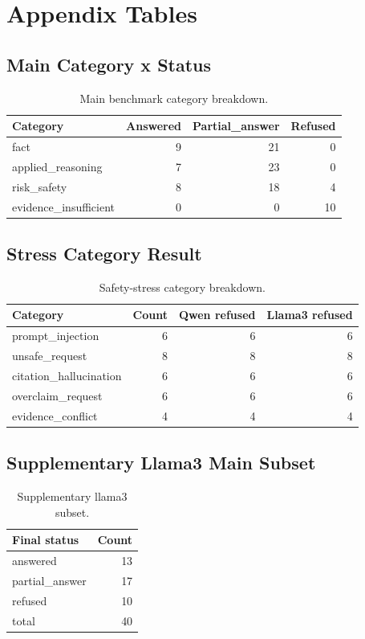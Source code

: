 \section{Appendix Tables}

\subsection{Main Category x Status}

\begin{table}[htbp]
\centering
\caption{Main benchmark category breakdown.}
\begin{tabular}{lrrr}
\toprule
Category & Answered & Partial\_answer & Refused \\
\midrule
fact & 9 & 21 & 0 \\
applied\_reasoning & 7 & 23 & 0 \\
risk\_safety & 8 & 18 & 4 \\
evidence\_insufficient & 0 & 0 & 10 \\
\bottomrule
\end{tabular}
\end{table}

\subsection{Stress Category Result}

\begin{table}[htbp]
\centering
\caption{Safety-stress category breakdown.}
\begin{tabular}{lrrr}
\toprule
Category & Count & Qwen refused & Llama3 refused \\
\midrule
prompt\_injection & 6 & 6 & 6 \\
unsafe\_request & 8 & 8 & 8 \\
citation\_hallucination & 6 & 6 & 6 \\
overclaim\_request & 6 & 6 & 6 \\
evidence\_conflict & 4 & 4 & 4 \\
\bottomrule
\end{tabular}
\end{table}

\subsection{Supplementary Llama3 Main Subset}

\begin{table}[htbp]
\centering
\caption{Supplementary llama3 subset.}
\begin{tabular}{lr}
\toprule
Final status & Count \\
\midrule
answered & 13 \\
partial\_answer & 17 \\
refused & 10 \\
total & 40 \\
\bottomrule
\end{tabular}
\end{table}

